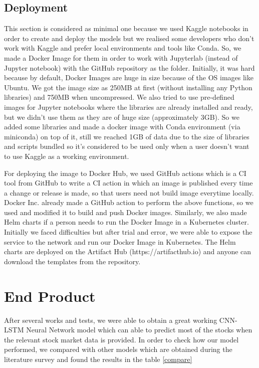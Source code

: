 \documentclass[conference]{IEEEtran}
\begin{document}
\subsection{Deployment}
This section is considered as minimal one because we used Kaggle notebooks in order to create and deploy the models but we realised some developers who don't work with Kaggle and prefer local environments and tools like Conda. So, we made a Docker Image for them in order to work with Jupyterlab (instead of Jupyter notebook) with the GitHub repository as the folder. Initially, it was hard because by default, Docker Images are huge in size because of the OS images like Ubuntu. We got the image size as 250MB at first (without installing any Python libraries) and 750MB when uncompressed. We also tried to use pre-defined images for Jupyter notebooks where the libraries are already installed and ready, but we didn't use them as they are of huge size (approximately 3GB). So we added some libraries and made a docker image with Conda environment (via miniconda) on top of it, still we reached 1GB of data due to the size of libraries and scripts bundled so it's considered to be used only when a user doesn't want to use Kaggle as a working environment.

For deploying the image to Docker Hub, we used GitHub actions which is a CI tool from GitHub to write a CI action in which an image is published every time a change or release is made, so that users need not build image everytime locally. Docker Inc. already made a GitHub action \cite{b13} to perform the above functions, so we used and modified it to build and push Docker images. Similarly, we also made Helm charts if a person needs to run the Docker Image in a Kubernetes cluster. Initially we faced difficulties but after trial and error, we were able to expose the service to the network and run our Docker Image in Kubernetes. The Helm charts are deployed on the Artifact Hub (https://artifacthub.io) and anyone can download the templates from the repository.

\section{End Product}
After several works and tests, we were able to obtain a great working CNN-LSTM Neural Network model which can able to predict most of the stocks when the relevant stock market data is provided. In order to check how our model performed, we compared with other models which are obtained during the literature survey and found the results in the table \ref{compare}
\end{document}
